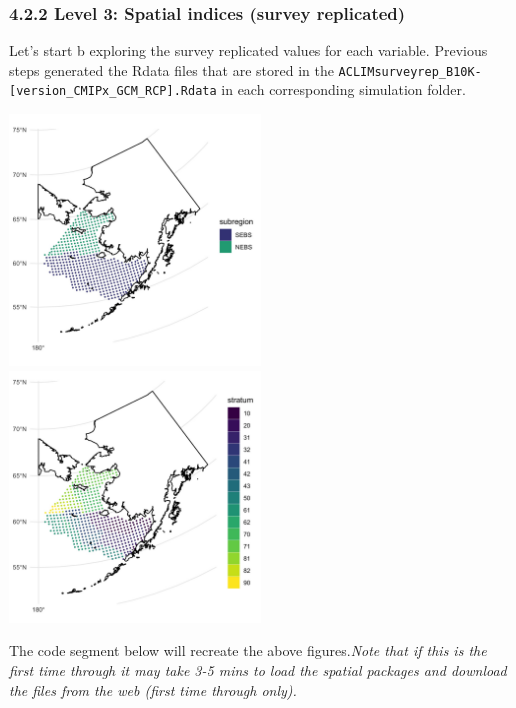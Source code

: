 \documentclass[
]{article}
\begin{document}
\hypertarget{level-3-spatial-indices-survey-replicated}{%
\subsubsection{4.2.2 Level 3: Spatial indices (survey
replicated)}\label{level-3-spatial-indices-survey-replicated}}

Let's start b exploring the survey replicated values for each variable.
Previous steps generated the Rdata files that are stored in the
\texttt{ACLIMsurveyrep\_B10K-{[}version\_CMIPx\_GCM\_RCP{]}.Rdata} in
each corresponding simulation folder.

\includegraphics[width=0.5\textwidth,height=\textheight]{Figs/stations_NS.jpg}
\includegraphics[width=0.5\textwidth,height=\textheight]{Figs/stations.jpg}

The code segment below will recreate the above figures.\emph{Note that
if this is the first time through it may take 3-5 mins to load the
spatial packages and download the files from the web (first time through
only).}
\end{document}
